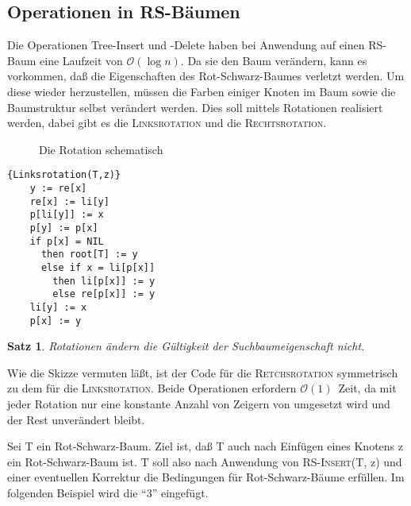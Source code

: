 \documentclass[ngerman,draft,parskip=half*,twoside]{scrreprt}
\theoremstyle{break}
\newtheorem{satz}{Satz}[chapter]
\theoremstyle{nonumberbreak}
\newcommand*{\OO}{\mathcal{O}}      %
\begin{document}
\subsection{Operationen in RS-Bäumen}

Die Operationen Tree-Insert und -Delete haben bei Anwendung auf einen RS-Baum eine Laufzeit von $\OO(\log n)$. Da
sie den Baum verändern, kann es vorkommen, daß die Eigenschaften des Rot-Schwarz-Baumes verletzt werden. Um diese wieder herzustellen,
müssen die
Farben einiger Knoten im Baum sowie die Baumstruktur selbst verändert werden. Dies soll mittels Rotationen realisiert werden, dabei
gibt es die \textsc{Linksrotation} und die \textsc{Rechtsrotation}.


\begin{figure}[H]
\centering

\caption{Die Rotation schematisch}
\end{figure}


\begin{Algorithmus}[H]
\begin{lstlisting}[frame=tlrb, mathescape=true, title=\textsc{Linksrotation\textnormal{(T, z)}}, gobble=4]{Linksrotation(T,z)}
    y := re[x]
    re[x] := li[y]
    p[li[y]] := x
    p[y] := p[x]
    if p[x] = NIL
      then root[T] := y
      else if x = li[p[x]]
        then li[p[x]] := y
        else re[p[x]] := y
    li[y] := x
    p[x] := y
\end{lstlisting}
\end{Algorithmus}

\begin{satz}
Rotationen ändern die Gültigkeit der Suchbaumeigenschaft nicht.
\end{satz}

Wie die Skizze vermuten läßt, ist der Code für die \textsc{Retchsrotation} symmetrisch zu dem für die \textsc{Linksrotation}. Beide
Operationen erfordern $\OO(1)$~Zeit, da mit jeder Rotation nur eine konstante Anzahl von Zeigern von umgesetzt wird und der Rest
unverändert bleibt.

Sei T ein Rot-Schwarz-Baum. Ziel ist, daß T auch nach Einfügen eines Knotens z ein Rot-Schwarz-Baum ist. T soll also 
nach Anwendung von \textsc{RS-Insert}(T, z) und einer eventuellen Korrektur die Bedingungen für Rot-Schwarz-Bäume erfüllen. Im folgenden Beispiel wird die "`3"'
eingefügt.
\end{document}
